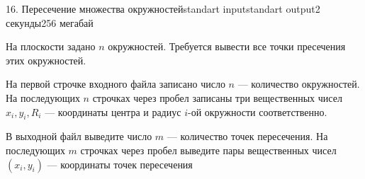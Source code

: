 \begin{problem}{16. Пересечение множества окружностей}{standart input}{standart output}{2 секунды}{256 мегабай}

На плоскости задано $n$ окружностей. Требуется вывести все точки пресечения этих окружностей.

\InputFile

На первой строчке входного файла записано число $n$ --- количество окружностей. На последующих $n$ строчках через пробел записаны три вещественных чисел $x_i, y_i, R_i$ --- координаты центра и радиус $i$-ой окружности соответственно.

\OutputFile

В выходной файл выведите число $m$ --- количество точек пересечения. На последующих $m$ строчках через пробел выведите пары вещественных чисел $(x_i, y_i)$ --- координаты точек пересечения

\Examples

\begin{example}%
%
\end{example}

\end{problem}
